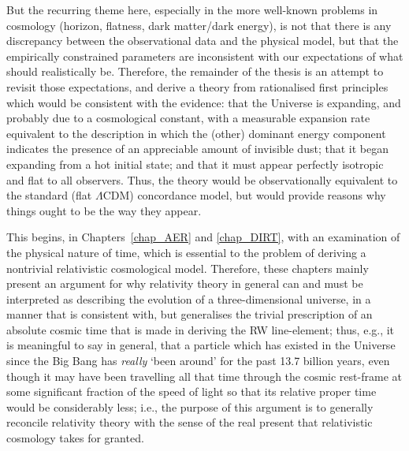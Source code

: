 But the recurring theme here, especially in the more well-known problems in cosmology (horizon, flatness, dark matter/dark energy), is not that there is any discrepancy between the observational data and the physical model, but that the empirically constrained parameters are inconsistent with our expectations of what should realistically be. Therefore, the remainder of the thesis is an attempt to revisit those expectations, and derive a theory from rationalised first principles which would be consistent with the evidence: that the Universe is expanding, and probably due to a cosmological constant, with a measurable expansion rate equivalent to the description in which the (other) dominant energy component indicates the presence of an appreciable amount of invisible dust; that it began expanding from a hot initial state; and that it must appear perfectly isotropic and flat to all observers. Thus, the theory would be observationally equivalent to the standard (flat $\Lambda$CDM) concordance model, but would provide reasons why things ought to be the way they appear.

This begins, in Chapters~\ref{chap_AER} and \ref{chap_DIRT}, with an examination of the physical nature of time, which is essential to the problem of deriving a nontrivial relativistic cosmological model. Therefore, these chapters mainly present an argument for why relativity theory in general can and must be interpreted as describing the evolution of a three-dimensional universe, in a manner that is consistent with, but generalises the trivial prescription of an absolute cosmic time that is made in deriving the RW line-element; thus, e.g., it is meaningful to say in general, that a particle which has existed in the Universe since the Big Bang has \textit{really} `been around' for the past 13.7 billion years, even though it may have been travelling all that time through the cosmic rest-frame at some significant fraction of the speed of light so that its relative proper time would be considerably less; i.e., the purpose of this argument is to generally reconcile relativity theory with the sense of the real present that relativistic cosmology takes for granted.

